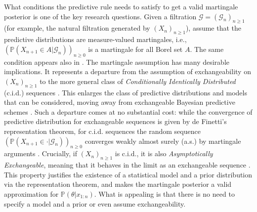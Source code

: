\documentclass{article}
\theoremstyle{definition}
\renewcommand{\&}{and}
\begin{document}
What conditions the predictive rule needs to satisfy to get a valid martingale posterior is one of the key research questions. Given a filtration $\mathcal{G}=(\mathcal{G}_n)_{n \geq 1}$ (for example, the natural filtration generated by $(X_{n})_{n \geq 1}$), \cite{fong2021martingale} assume that the predictive distributions are measure-valued martingales, i.e., $(\mathbb{P}(X_{n+1} \in A |\mathcal{G}_n))_{n \geq 0}$ is a martingale for all Borel set $A$. %
The same condition appears also in \cite{fortini2020quasi}. The martingale assumption has many desirable implications.  It represents a departure from the assumption of exchangeability on $(X_n)_{n\geq 1}$ to the more general class of \textit{Conditionally Identically Distributed} (c.i.d.) sequences \citep{kal88,berti2004limit}. This enlarges the class of predictive distributions and models that can be considered, moving away from exchangeable Bayesian predictive schemes \citep[e.g.][]{fortini2020quasi}. Such a departure comes at no substantial cost: while the convergence of predictive distribution for exchangeable sequences is given by de Finetti's representation theorem, for c.i.d. sequences the random sequence  $(\mathbb{P}(X_{n+1} \in \cdot |\mathcal{G}_n))_{n \geq 0}$ converges weakly almost surely (a.s.) by martingale arguments \citep[see][]{ald85}. Crucially,  if $(X_n)_{n\geq 1}$ is c.i.d., it is also \textit{Asymptotically Exchangeable}, meaning that it behaves in the limit as an exchangeable sequence \citep{ald85}. This property justifies the existence of a statistical model and a prior distribution via the representation theorem, and makes the martingale posterior a valid approximation for $\mathbb{P}(\theta|x_{1:n})$. %
What is appealing is that there is no need to specify a model and a prior or even assume exchangeability.
\end{document}
